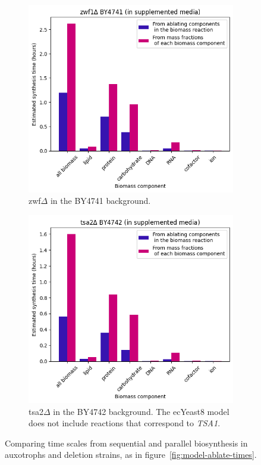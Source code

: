 \begin{figure}
\begin{subfigure}[htpb]{0.45\textwidth}
   \includegraphics[width=\textwidth]{ablation_zwf1}
   \caption{
     zwf$\Delta$ in the BY4741 background.
   }
   \label{fig:model-ablation-zwf1}
  \end{subfigure}
  \begin{subfigure}[htpb]{0.45\textwidth}
   \centering
   \includegraphics[width=\textwidth]{ablation_tsa2}
   \caption{
     tsa2$\Delta$ in the BY4742 background.  The ecYeast8 model does not include reactions that correspond to \textit{TSA1}.
   }
   \label{fig:model-ablation-tsa2}
  \end{subfigure}
  \caption{
    Comparing time scales from sequential and parallel biosynthesis in auxotrophs and deletion strains, as in figure~\ref{fig:model-ablate-times}.
  }
  \label{fig:model-ablation-strains}
\end{figure}
